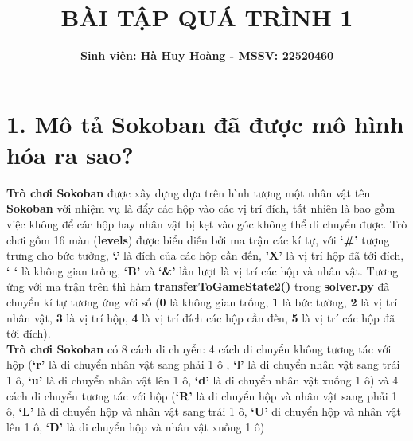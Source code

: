 \documentclass[a4paper,12pt]{article}
\title{\textbf{BÀI TẬP QUÁ TRÌNH 1}}
\author{\textbf{Sinh viên: Hà Huy Hoàng - MSSV: 22520460}}
\begin{document}
\maketitle
\vspace{5cm}
\section*{1. Mô tả Sokoban đã được mô hình hóa ra sao?}

\hspace*{7mm}\textbf{Trò chơi Sokoban} được xây dựng dựa trên hình tượng một nhân vật tên \textbf{Sokoban} với nhiệm vụ là đẩy các hộp vào các vị trí đích, tất nhiên là bao gồm việc không để các hộp hay nhân vật bị kẹt vào góc không thể di chuyển được. Trò chơi gồm 16 màn (\textbf{levels}) được biểu diễn bởi ma trận các kí tự, với \textbf{‘\#’} tượng trưng cho bức tường, \textbf{‘.’} là đích của các hộp cần đến, \textbf{’X’} là vị trí hộp đã tới đích, \textbf{‘ ‘} là không gian trống, \textbf{‘B’} và \textbf{‘\&’} lần lượt là vị trí các hộp và nhân vật. Tương ứng với ma trận trên thì hàm \textbf{transferToGameState2()} trong \textbf{solver.py} đã chuyển kí tự tương ứng với số (\textbf{0} là không gian trống, \textbf{1} là bức tường, \textbf{2} là vị trí nhân vật, \textbf{3} là vị trí hộp, \textbf{4} là vị trí đích các hộp cần đến, \textbf{5} là vị trí các hộp đã tới đích).\\

\textbf{Trò chơi Sokoban} có 8 cách di chuyển: 4 cách di chuyển không tương tác với hộp (\textbf{‘r’} là di chuyển nhân vật sang phải 1 ô , \textbf{‘l’} là di chuyển nhân vật sang trái 1 ô, \textbf{‘u’} là di chuyển nhân vật lên 1 ô, \textbf{‘d’} là di chuyển nhân vật xuống 1 ô) và 4 cách di chuyển tương tác với hộp (\textbf{‘R’} là di chuyển hộp và nhân vật sang phải 1 ô, \textbf{‘L’} là di chuyển hộp và nhân vật sang trái 1 ô, \textbf{‘U’} di chuyển hộp và nhân vật lên 1 ô, \textbf{‘D’} là di chuyển hộp và nhân vật xuống 1 ô)
\newpage
\end{document}
